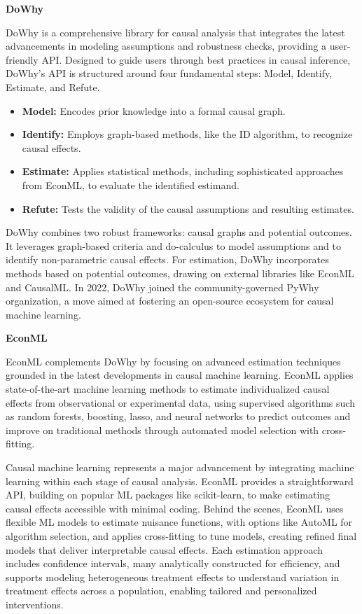 \documentclass[12pt]{report}
\begin{document}
    {\bfseries DoWhy}

    DoWhy is a comprehensive library for causal analysis that integrates the latest advancements in modeling assumptions and robustness checks, providing a user-friendly API. Designed to guide users through best practices in causal inference, DoWhy’s API is structured around four fundamental steps: Model, Identify, Estimate, and Refute.
    \begin{itemize}
        \item {\bfseries Model:} Encodes prior knowledge into a formal causal graph.
        \item {\bfseries Identify:} Employs graph-based methods, like the ID algorithm, to recognize causal effects.
        \item {\bfseries Estimate:} Applies statistical methods, including sophisticated approaches from EconML, to evaluate the identified estimand.
        \item {\bfseries Refute:} Tests the validity of the causal assumptions and resulting estimates.
    \end{itemize}
    
    DoWhy combines two robust frameworks: causal graphs and potential outcomes. It leverages graph-based criteria and do-calculus to model assumptions and to identify non-parametric causal effects. For estimation, DoWhy incorporates methods based on potential outcomes, drawing on external libraries like EconML and CausalML. In 2022, DoWhy joined the community-governed PyWhy organization, a move aimed at fostering an open-source ecosystem for causal machine learning.

    {\bfseries EconML}

    EconML complements DoWhy by focusing on advanced estimation techniques grounded in the latest developments in causal machine learning. EconML applies state-of-the-art machine learning methods to estimate individualized causal effects from observational or experimental data, using supervised algorithms such as random forests, boosting, lasso, and neural networks to predict outcomes and improve on traditional methods through automated model selection with cross-fitting.

    Causal machine learning represents a major advancement by integrating machine learning within each stage of causal analysis. EconML provides a straightforward API, building on popular ML packages like scikit-learn, to make estimating causal effects accessible with minimal coding. Behind the scenes, EconML uses flexible ML models to estimate nuisance functions, with options like AutoML for algorithm selection, and applies cross-fitting to tune models, creating refined final models that deliver interpretable causal effects. Each estimation approach includes confidence intervals, many analytically constructed for efficiency, and supports modeling heterogeneous treatment effects to understand variation in treatment effects across a population, enabling tailored and personalized interventions.
\end{document}
